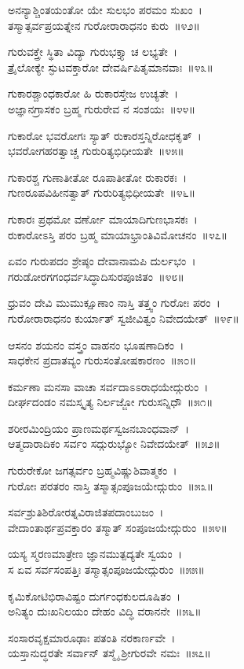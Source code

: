 ಅನನ್ಯಾಶ್ಚಿಂತಯಂತೋ ಯೇ ಸುಲಭಂ ಪರಮಂ ಸುಖಂ~।\\
ತಸ್ಮಾತ್ಸರ್ವಪ್ರಯತ್ನೇನ ಗುರೋರಾರಾಧನಂ ಕುರು~॥೪೨॥

ಗುರುವಕ್ತ್ರೇ ಸ್ಥಿತಾ ವಿದ್ಯಾ ಗುರುಭಕ್ತ್ಯಾ ಚ ಲಭ್ಯತೇ~।\\
ತ್ರೈಲೋಕ್ಯೇ ಸ್ಫುಟವಕ್ತಾರೋ ದೇವರ್ಷಿಪಿತೃಮಾನವಾಃ~॥೪೩॥

ಗುಕಾರಶ್ಚಾಂಧಕಾರೋ ಹಿ ರುಕಾರಸ್ತೇಜ ಉಚ್ಯತೇ~।\\
ಅಜ್ಞಾನಗ್ರಾಸಕಂ ಬ್ರಹ್ಮ ಗುರುರೇವ ನ ಸಂಶಯಃ~॥೪೪॥

ಗುಕಾರೋ ಭವರೋಗಃ ಸ್ಯಾತ್ ರುಕಾರಸ್ತನ್ನಿರೋಧಕೃತ್~।\\
ಭವರೋಗಹರತ್ವಾಚ್ಚ ಗುರುರಿತ್ಯಭಿಧೀಯತೇ~॥೪೫॥

ಗುಕಾರಶ್ಚ ಗುಣಾತೀತೋ ರೂಪಾತೀತೋ ರುಕಾರಕಃ~।\\
ಗುಣರೂಪವಿಹೀನತ್ವಾತ್ ಗುರುರಿತ್ಯಭಿಧೀಯತೇ~॥೪೬॥

ಗುಕಾರಃ ಪ್ರಥಮೋ ವರ್ಣೋ ಮಾಯಾದಿಗುಣಭಾಸಕಃ~।\\
ರುಕಾರೋಽಸ್ತಿ ಪರಂ ಬ್ರಹ್ಮ ಮಾಯಾಭ್ರಾಂತಿವಿಮೋಚನಂ~॥೪೭॥

ಏವಂ ಗುರುಪದಂ ಶ್ರೇಷ್ಠಂ ದೇವಾನಾಮಪಿ ದುರ್ಲಭಂ~।\\
ಗರುಡೋರಗಗಂಧರ್ವಸಿದ್ಧಾದಿಸುರಪೂಜಿತಂ~॥೪೮॥

ಧ್ರುವಂ ದೇವಿ ಮುಮುಕ್ಷೂಣಾಂ ನಾಸ್ತಿ ತತ್ತ್ವಂ ಗುರೋಃ ಪರಂ~।\\
ಗುರೋರಾರಾಧನಂ ಕುರ್ಯಾತ್ ಸ್ವಜೀವಿತ್ವಂ ನಿವೇದಯೇತ್~॥೪೯॥

ಆಸನಂ ಶಯನಂ ವಸ್ತ್ರಂ ವಾಹನಂ ಭೂಷಣಾದಿಕಂ~।\\
ಸಾಧಕೇನ ಪ್ರದಾತವ್ಯಂ ಗುರುಸಂತೋಷಕಾರಣಂ~॥೫೦॥

ಕರ್ಮಣಾ ಮನಸಾ ವಾಚಾ ಸರ್ವದಾಽಽರಾಧಯೇದ್ಗುರುಂ~।\\
ದೀರ್ಘದಂಡಂ ನಮಸ್ಕೃತ್ಯ ನಿರ್ಲಜ್ಜೋ ಗುರುಸನ್ನಿಧೌ~॥೫೧॥

ಶರೀರಮಿಂದ್ರಿಯಂ ಪ್ರಾಣಮರ್ಥಸ್ವಜನಬಾಂಧವಾನ್~।\\
ಆತ್ಮದಾರಾದಿಕಂ ಸರ್ವಂ ಸದ್ಗುರುಭ್ಯೋ ನಿವೇದಯೇತ್~॥೫೨॥

ಗುರುರೇಕೋ ಜಗತ್ಸರ್ವಂ ಬ್ರಹ್ಮವಿಷ್ಣುಶಿವಾತ್ಮಕಂ~।\\
ಗುರೋಃ ಪರತರಂ ನಾಸ್ತಿ ತಸ್ಮಾತ್ಸಂಪೂಜಯೇದ್ಗುರುಂ~॥೫೩॥

ಸರ್ವಶ್ರುತಿಶಿರೋರತ್ನವಿರಾಜಿತಪದಾಂಬುಜಂ~।\\
ವೇದಾಂತಾರ್ಥಪ್ರವಕ್ತಾರಂ ತಸ್ಮಾತ್ ಸಂಪೂಜಯೇದ್ಗುರುಂ~॥೫೪॥

ಯಸ್ಯ ಸ್ಮರಣಮಾತ್ರೇಣ ಜ್ಞಾನಮುತ್ಪದ್ಯತೇ ಸ್ವಯಂ~।\\
ಸ ಏವ ಸರ್ವಸಂಪತ್ತಿಃ ತಸ್ಮಾತ್ಸಂಪೂಜಯೇದ್ಗುರುಂ~॥೫೫॥

ಕೃಮಿಕೋಟಿಭಿರಾವಿಷ್ಟಂ ದುರ್ಗಂಧಕುಲದೂಷಿತಂ~।\\
ಅನಿತ್ಯಂ ದುಃಖನಿಲಯಂ ದೇಹಂ ವಿದ್ಧಿ ವರಾನನೇ~॥೫೬॥

ಸಂಸಾರವೃಕ್ಷಮಾರೂಢಾಃ ಪತಂತಿ ನರಕಾರ್ಣವೇ~।\\
ಯಸ್ತಾನುದ್ಧರತೇ ಸರ್ವಾನ್ ತಸ್ಮೈ ಶ್ರೀಗುರವೇ ನಮಃ~॥೫೭॥

